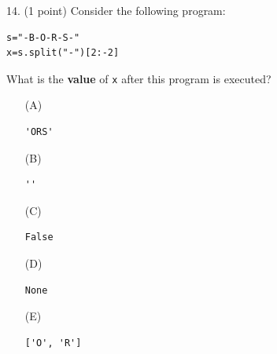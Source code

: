 \documentclass{article}
\begin{document}
\noindent
\begin{minipage}{\textwidth}
14. (1 point)
Consider the following program:
\begin{verbatim}
s="-B-O-R-S-"
x=s.split("-")[2:-2]
\end{verbatim}
What is the \textbf{value} of \texttt{x} after this program is executed?

\begin{enumerate}
\item[(A)]
\begin{verbatim}'ORS'\end{verbatim}

\item[(B)]
\begin{verbatim}''\end{verbatim}

\item[(C)]
\begin{verbatim}False\end{verbatim}

\item[(D)]
\begin{verbatim}None\end{verbatim}

\item[(E)]
\begin{verbatim}['O', 'R']\end{verbatim}

\end{enumerate}
\end{minipage}
\vspace{2em}
\filbreak\vfil{}\vfilneg
\end{document}
